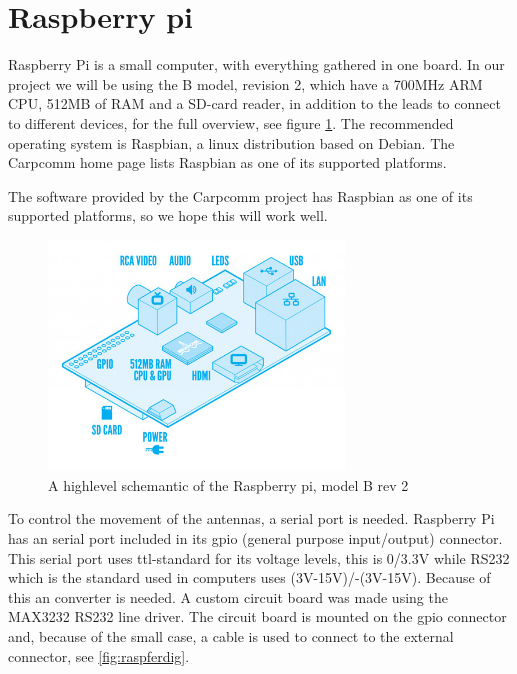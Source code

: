\section{Raspberry pi}
Raspberry Pi is a small computer, with everything gathered in one board. In our project we will be using the B model, revision 2, which have a 700MHz ARM CPU, 512MB of RAM and a SD-card reader, in addition to the leads to connect to different devices, for  the full overview, see figure \ref{fig:raspberrypihighlevel}. The recommended operating system is Raspbian, a linux distribution based on Debian. The Carpcomm home page lists Raspbian as one of its supported platforms.

The software provided by the Carpcomm project has Raspbian as one of its supported platforms, so we hope this will work well.

\begin{figure}
	\begin{center}
		\includegraphics[width=0.7\textwidth]{Figures/raspberrypi_modelb_hl.jpg}
	\end{center}
	\caption[Raspberry pi highlevel]{A highlevel schemantic of the Raspberry pi, model B rev 2}
	\label{fig:raspberrypihighlevel}
\end{figure}

To control the movement of the antennas, a serial port is needed. Raspberry Pi has an serial port included in its gpio (general purpose input/output) connector. This serial port uses ttl-standard for its voltage levels, this is 0/3.3V while RS232 which is the standard used in computers uses (3V-15V)/-(3V-15V). Because of this an converter is needed. A custom circuit board was made using the MAX3232 RS232 line driver.%
The circuit board is mounted on the gpio connector and, because of the small case, a cable is used to connect to the external connector, see \autoref{fig:raspferdig}.

